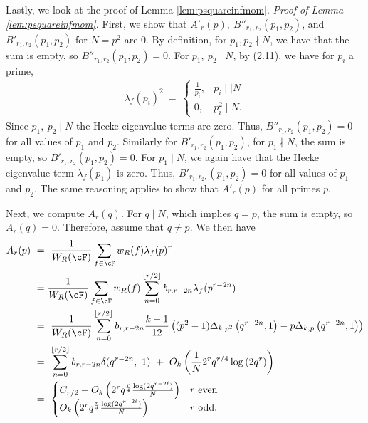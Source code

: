 \documentclass[11pt, reqno]{amsart}
\theoremstyle{definition}
\theoremstyle{remark}
\numberwithin{equation}{section}
\begin{document}
Lastly, we look at the proof of Lemma \ref{lem:psquareinfmom}.
\noindent \textit{Proof of Lemma \ref{lem:psquareinfmom}.}
First, we show that $A'_{r}(p), \ B''_{r_1,r_2}(p_1, p_2)$, and $B'_{r_1,r_2}(p_1, p_2)$ for $N = p^2$ are 0. 
By definition, for $p_1,p_2 \nmid N$, we have that the sum is empty, so $B''_{r_1,r_2}(p_1, p_2) = 0$. For $p_1,~p_2 \mid N$, by \cite{BarrettEtAl2016arXiv} (2.11), we have for $p_i$ a prime,
\begin{align*}
    \lambda_f(p_i)^2 \ = \ \begin{cases}
        \frac{1}{p_i}, & p_i \mid\mid N \\
        0, & p_i^2 \mid N.
    \end{cases}
\end{align*}
Since $p_1,~p_2 \mid N$ the Hecke eigenvalue terms are zero. Thus, $B''_{r_1,r_2}(p_1, p_2) = 0$ for all values of $p_1$ and $p_2$.
Similarly for $B'_{r_1,r_2}(p_1, p_2)$, for $p_1 \nmid N$, the sum is empty, so $B'_{r_1,r_2}(p_1, p_2) = 0$. For $p_1 \mid N$, we again have that the Hecke eigenvalue term $\lambda_f(p_1)$ is zero. Thus, $B'_{r_1,r_2,}(p_1, p_2) = 0$ for all values of $p_1$ and $p_2$. The same reasoning applies to show that $A'_{r}(p)$ for all primes $p$.

Next, we compute $A_r(q)$.
For $q \mid N$, which implies $q = p$, the sum is empty, so $A_r(q) = 0$. Therefore, assume that $q \neq p$.
We then have
\begin{align}
    A_r(p)\ &=\ \frac{1}{W_R(\cF)} \sum_{f\in\cF} w_R(f) \lambda_f(p)^{r} \notag \\& = \frac{1}{W_R(\cF)} \sum_{f\in\cF} w_R(f) \sum_{n=0}^{\lfloor r/2\rfloor }b_{r,r-2n}\lambda_f(p^{r-2n}) \notag \\
    \ &=\ \frac{1}{W_R(\cF)} \sum_{n=0}^{\lfloor r/2\rfloor }b_{r,r-2n}\frac{k-1}{12} \left((p^2-1)\Delta_{k,p^2}\left(q^{r-2n}, 1\right)-p\Delta_{k,p}\left(q^{r-2n}, 1\right)\right) \notag\\
    \ &=\ \sum_{n=0}^{\lfloor r/2\rfloor }b_{r,r-2n}\delta(q^{r-2n},~1) \ + \ O_k\left(\frac{1}{N}2^rq^{r/4}\log{(2q^r)}\right)\notag\\
    \ &=\ \begin{cases}
        C_{r/2} + O_k\left(2^rq^\frac{r}{4} \frac{\log(2q^{r-2\ell})}{N}\right)& r  \ \text{even} \\
       O_k\left(2^rq^\frac{r}{4} \frac{\log(2q^{r-2\ell})}{N}\right) & r  \ \text{odd}.
    \end{cases}
\end{align}
\end{document}
